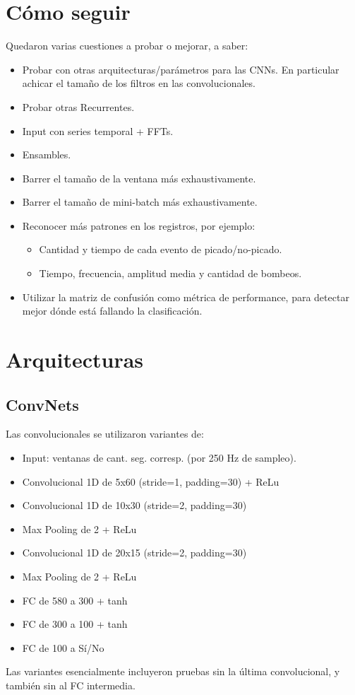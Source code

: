 \documentclass[a4paper,twocolumn]{article}
\begin{document}
\section{Cómo seguir}
Quedaron varias cuestiones a probar o mejorar, a saber:
\begin{itemize}
		\item Probar con otras arquitecturas/parámetros para las CNNs. En particular achicar el tamaño de los filtros en las convolucionales.
\item Probar otras Recurrentes.
\item Input con series temporal + FFTs.
\item Ensambles.
\item Barrer el tamaño de la ventana más exhaustivamente.
\item Barrer el tamaño de mini-batch más exhaustivamente.
\item Reconocer más patrones en los registros, por ejemplo:
\begin{itemize}
	\item Cantidad y tiempo de cada evento de picado/no-picado.
	\item Tiempo, frecuencia, amplitud media y cantidad de bombeos. 
\end{itemize}
\item Utilizar la matriz de confusión como métrica de performance, para detectar mejor dónde está fallando la clasificación.

\end{itemize}


\section{Arquitecturas}
\subsection{ConvNets}
Las convolucionales se utilizaron variantes de:
	\begin{itemize}
	\item Input: ventanas de cant. seg. corresp. (por 250 Hz de sampleo).
	\item Convolucional 1D de 5x60 (stride=1, padding=30) + ReLu
	\item Convolucional 1D de 10x30 (stride=2, padding=30)
	\item Max Pooling de 2 + ReLu
	\item Convolucional 1D de 20x15 (stride=2, padding=30)
	\item Max Pooling de 2 + ReLu
	\item FC de 580 a 300 + tanh
	\item FC de 300 a 100 + tanh
	\item FC de 100 a Sí/No
\end{itemize}
Las variantes esencialmente incluyeron pruebas sin la última convolucional, y también sin al FC intermedia.
\end{document}
